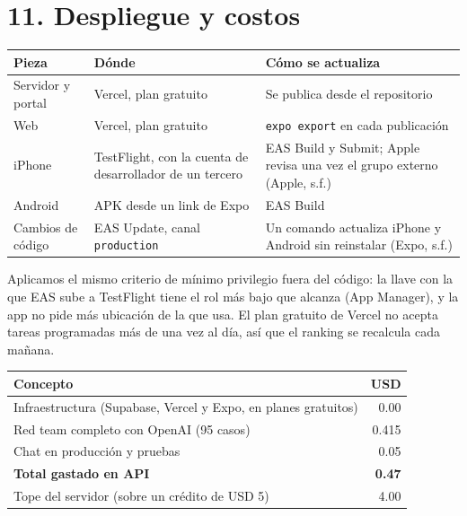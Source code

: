 \documentclass[12pt,a4paper]{article}
\begin{document}
\section{11. Despliegue y costos}

\begin{center}
\renewcommand{\arraystretch}{1.35}
\begin{tabular}{|>{\raggedright\arraybackslash}p{3.2cm}|>{\raggedright\arraybackslash}p{4.4cm}|>{\raggedright\arraybackslash}p{6cm}|}
\hline
\textbf{Pieza} & \textbf{Dónde} & \textbf{Cómo se actualiza} \\
\hline
Servidor y portal & Vercel, plan gratuito & Se publica desde el repositorio \\
\hline
Web & Vercel, plan gratuito & \texttt{expo export} en cada publicación \\
\hline
iPhone & TestFlight, con la cuenta de desarrollador de un tercero & EAS Build y Submit; Apple
revisa una vez el grupo externo (Apple, s.f.) \\
\hline
Android & APK desde un link de Expo & EAS Build \\
\hline
Cambios de código & EAS Update, canal \texttt{production} & Un comando actualiza iPhone y Android
sin reinstalar (Expo, s.f.) \\
\hline
\end{tabular}
\end{center}

Aplicamos el mismo criterio de mínimo privilegio fuera del código: la llave con la que EAS sube a
TestFlight tiene el rol más bajo que alcanza (App Manager), y la app no pide más ubicación de la que
usa. El plan gratuito de Vercel no acepta tareas programadas más de una vez al día, así que el
ranking se recalcula cada mañana.

\begin{center}
\renewcommand{\arraystretch}{1.35}
\begin{tabular}{|>{\raggedright\arraybackslash}p{8.4cm}|r|}
\hline
\textbf{Concepto} & \textbf{USD} \\
\hline
Infraestructura (Supabase, Vercel y Expo, en planes gratuitos) & 0.00 \\
\hline
Red team completo con OpenAI (95 casos) & 0.415 \\
\hline
Chat en producción y pruebas & 0.05 \\
\hline
\textbf{Total gastado en API} & \textbf{0.47} \\
\hline
Tope del servidor (sobre un crédito de USD 5) & 4.00 \\
\hline
\end{tabular}
\end{center}
\end{document}
